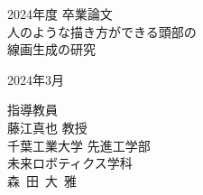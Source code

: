 \documentclass[12pt,titlepage,a4j,oneside]{myjbook2}
\begin{document}
  \begin{titlepage}
    \begin{center}
      \vspace*{1cm}
      \LARGE 2024年度 卒業論文 \\
      \vspace*{1cm}
      \Huge 人のような描き方ができる頭部の \\
      線画生成の研究 \\
      \vspace*{45mm}

      {\LARGE %
      2024年3月}
      \vspace*{10mm}
      
      {\Large
      指導教員 \\
      藤江真也 教授} \\
      \vspace*{20mm}
      \LARGE
      千葉工業大学 先進工学部 \\
      未来ロボティクス学科 \\
      \vspace*{10mm}
      {\Huge 森~田~大~雅}
    \end{center}
  \end{titlepage}

  \frontmatter
  \baselineskip=21pt
  \tableofcontents
  \listoffigures
  \listoftables

  \setlength{\abovedisplayskip}{25pt plus0pt minus0pt}
  \setlength{\belowdisplayskip}{25pt plus0pt minus0pt}

  \mainmatter
  

  

  

  

  

  
  
  

  \backmatter
  

  

  \mainmatter
  \addtocounter{page}{2}
  \appendix
  
\end{document}
